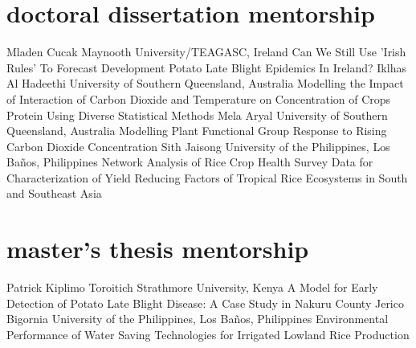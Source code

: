 \section*{doctoral dissertation mentorship}
\begin{entrylist}
    {Mladen Cucak {}}
    {Maynooth University/TEAGASC, Ireland}
    {Can We Still Use 'Irish Rules' To Forecast Development Potato Late Blight Epidemics In Ireland?}
    {Iklhas Al Hadeethi {}}
    {University of Southern Queensland, Australia}
    {Modelling the Impact of Interaction of Carbon Dioxide and Temperature on Concentration of Crops Protein Using Diverse Statistical Methods}
    {Mela Aryal {}}
    {University of Southern Queensland, Australia}
    {Modelling Plant Functional Group Response to Rising Carbon Dioxide Concentration}
    {Sith Jaisong {}}
    {University of the Philippines, Los Ba\~nos, Philippines}
    {Network Analysis of Rice Crop Health Survey Data for Characterization of Yield Reducing Factors of Tropical Rice Ecosystems in South and Southeast Asia}
\end{entrylist}

\section*{master's thesis mentorship}
\begin{entrylist}
    {Patrick Kiplimo Toroitich {}}
    {Strathmore University, Kenya}
    {A Model for Early Detection of Potato Late Blight Disease: A Case Study in Nakuru County}
    {Jerico Bigornia {}}
    {University of the Philippines, Los Ba\~nos, Philippines}
    {Environmental Performance of Water Saving Technologies for Irrigated Lowland Rice Production}
\end{entrylist}
